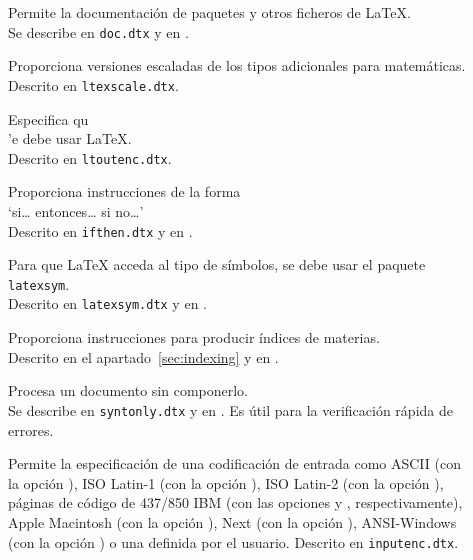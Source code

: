 \begin{table}[!hbp]
\caption{Algunos paquetes distribuidos con \LaTeX}
\label{packages}
\begin{description}
\item[\normalfont{}] Permite la documentaci\'on de paquetes y
  otros ficheros de \LaTeX.\\ Se describe en \texttt{doc.dtx} y en
  \companion.

\item[\normalfont{}] Proporciona versiones escaladas de
  los tipos adicionales para matem\'aticas.\\
 Descrito en \texttt{ltexscale.dtx}.

\item[\normalfont{}] Especifica qu\\'e  debe usar \LaTeX.\\ Descrito en \texttt{ltoutenc.dtx}.
    \vspace{5cm}

\item[\normalfont{}] Proporciona instrucciones de la forma\\
  `si\ldots{} entonces\ldots{} si no\ldots'\\ Descrito en
  \texttt{ifthen.dtx} y en \companion.

\item[\normalfont{}] Para que \LaTeX{} acceda al tipo
  de s\'imbolos, se debe usar el paquete \texttt{latexsym}.\\ Descrito
  en \texttt{latexsym.dtx} y en \companion.

\item[\normalfont{}] Proporciona instrucciones para
  producir \'indices de materias.\\ Descrito en el
  apartado~\ref{sec:indexing} y en \companion.

\item[\normalfont{}] Procesa un documento sin
  componerlo.\\ Se describe en \texttt{syntonly.dtx} y en \companion.
  Es \'util para la verificaci\'on r\'apida de errores.

\item[\normalfont{}] Permite la especificaci\'on de una
  codificaci\'on de entrada como ASCII (con la opci\'on ),
  ISO Latin-1 (con la opci\'on ), ISO Latin-2 (con la
  opci\'on ), p\'aginas de c\'odigo de 437/850 IBM (con las
  opciones  y , respectivamente), Apple
  Macintosh (con la opci\'on ), Next (con la opci\'on
  ), ANSI-Windows (con la opci\'on ) o una
  definida por el usuario.  Descrito en \texttt{inputenc.dtx}.

\end{description}
\end{table}

